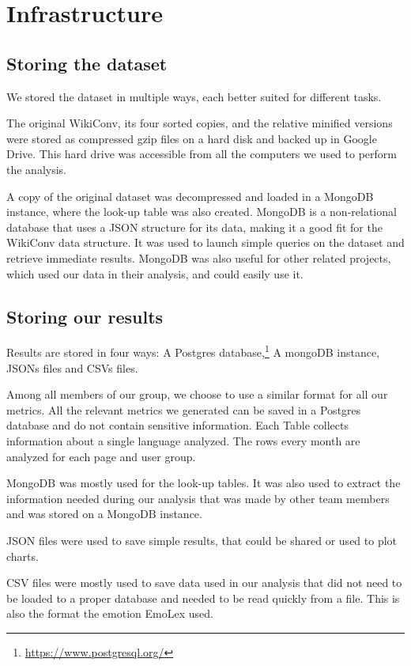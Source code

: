 \chapter{Infrastructure}
\label{cha:infrastructure}

\section{Storing the dataset}
\label{sec:storingthedataset}
We stored the dataset in multiple ways, each better suited for different tasks.

The original WikiConv, its four sorted copies, and the relative minified versions were stored as compressed gzip files on a hard disk and backed up in Google Drive. This hard drive was accessible from all the computers we used to perform the analysis.

A copy of the original dataset was decompressed and loaded in a MongoDB instance, where the look-up table was also created. MongoDB is a non-relational database that uses a JSON structure for its data, making it a good fit for the WikiConv data structure. It was used to launch simple queries on the dataset and retrieve immediate results. MongoDB was also useful for other related projects, which used our data in their analysis, and could easily use it.

\section{Storing our results}
\label{sec:storingourresults}
Results are stored in four ways: A Postgres database,\footnote{\url{https://www.postgresql.org/}} A mongoDB instance, JSONs files and CSVs files.

Among all members of our group, we choose to use a similar format for all our metrics. All the relevant metrics we generated can be saved in a Postgres database and do not contain sensitive information. Each Table collects information about a single language analyzed. The rows every month are analyzed for each page and user group.

MongoDB was mostly used for the look-up tables. It was also used to extract the information needed during our analysis that was made by other team members and was stored on a MongoDB instance.

JSON files were used to save simple results, that could be shared or used to plot charts.

CSV files were mostly used to save data used in our analysis that did not need to be loaded to a proper database and needed to be read quickly from a file. This is also the format the emotion EmoLex used.

